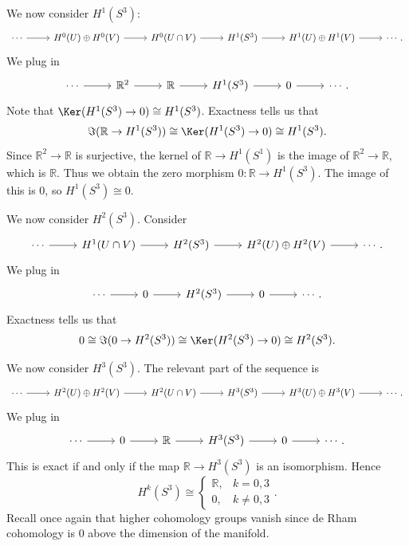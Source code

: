 \documentclass[11pt, letterpaper]{article}
\theoremstyle{plain}
\begin{document}
We now consider $H^1(S^3)$:
\[\begin{tikzcd}[row sep = 2.5em, column sep = 2.5em]
	\cdots\ar[r]   & H^0(U)\oplus H^0(V)\ar[r] & H^0(U \cap V)\ar[r]  & H^1(S^3)\ar[r]  & H^1(U )\oplus H^1( V)\ar[r]   & \cdots .
\end{tikzcd}\]
We plug in 
\[\begin{tikzcd}[row sep = 2.5em, column sep = 2.5em]
	\cdots\ar[r] & \mathbb{R} ^2 \ar[r]  & \mathbb{R} \ar[r]  & H^1(S^3)\ar[r]  & 0\ar[r]   & \cdots .
\end{tikzcd}\]
Note that $\Ker (H^1(S^3)\to 0)\cong H^1(S^3)$. Exactness tells us that 
\[
	\Im (\mathbb{R} \to H^1(S^3))\cong \Ker (H^1(S^3)\to 0)\cong H^1(S^3).
\]
Since $\mathbb{R} ^2\to \mathbb{R} $ is surjective, the kernel of $\mathbb{R} \to H^1(S^1)$ is the image of $\mathbb{R} ^2\to \mathbb{R} $, which is $\mathbb{R} $. Thus we obtain the zero morphism $0: \mathbb{R}  \to H^1(S^3)$. The image of this is 0, so $H^1(S^3)\cong 0$.

We now consider $H^2(S^3)$. Consider
\[\begin{tikzcd}[row sep = 2.5em, column sep = 2.5em]
	\cdots \ar[r]  & H^1(U \cap V)\ar[r]  & H^2(S^3)\ar[r]  & H^2(U)\oplus H^2(V)\ar[r]  & \cdots .
\end{tikzcd}\]
We plug in
\[\begin{tikzcd}[row sep = 2.5em, column sep = 2.5em]
\cdots \ar[r]  & 0\ar[r]  & H^2(S^3)\ar[r]  & 0\ar[r]  & \cdots .
\end{tikzcd}\]
Exactness tells us that
\[
	0 \cong \Im (0\to H^2(S^3))\cong \Ker (H^2(S^3)\to 0)\cong H^2(S^3)
.\]

We now consider $H^3(S^3)$. The relevant part of the sequence is
\[\begin{tikzcd}[row sep = 2.5em, column sep = 2.5em]
	\cdots \ar[r] & H^2(U)\oplus H^2(V)\ar[r]   & H^2(U \cap V)\ar[r]  & H^3(S^3)\ar[r]  & H^3(U)\oplus H^3(V)\ar[r]  & \cdots .
\end{tikzcd}\]
We plug in
\[\begin{tikzcd}[row sep = 2.5em, column sep = 2.5em]
\cdots \ar[r]  & 0\ar[r]  & \mathbb{R} \ar[r]  & H^3(S^3)\ar[r]  & 0\ar[r]  & \cdots .
\end{tikzcd}\]
This is exact if and only if the map $\mathbb{R} \to H^3(S^3)$ is an isomorphism. Hence
\[
	H^k(S^3) \cong 
	\begin{cases}
		\mathbb{R} ,&k=0,3\\
		0,&k\neq 0,3
	\end{cases}
.\]
Recall once again that higher cohomology groups vanish since de Rham cohomology is 0 above the dimension of the manifold.
\end{document}
